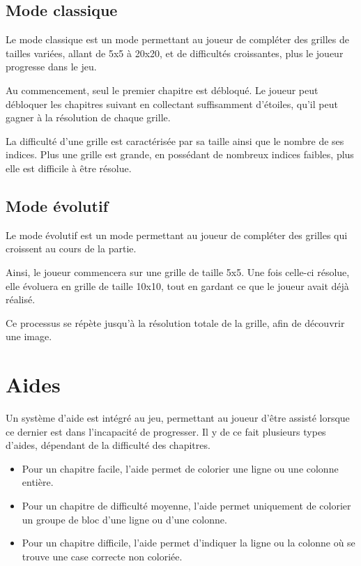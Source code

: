 \documentclass[a4paper, 12pt]{report}
\begin{document}
		\subsection{Mode classique}
		
		    Le mode classique est un mode permettant au joueur de compléter des grilles de tailles variées, allant de 5x5 à 20x20, et de difficultés croissantes, plus le joueur progresse dans le jeu.
		    
		    Au commencement, seul le premier chapitre est débloqué. Le joueur peut débloquer les chapitres suivant en collectant suffisamment d'étoiles, qu'il peut gagner à la résolution de chaque grille.
		    
		    La difficulté d'une grille est caractérisée par sa taille ainsi que le nombre de ses indices. Plus une grille est grande, en possédant de nombreux indices faibles, plus elle est difficile à être résolue.
		    
		\subsection{Mode évolutif}
		
		    Le mode évolutif est un mode permettant au joueur de compléter des grilles qui croissent au cours de la partie.
		    
		    Ainsi, le joueur commencera sur une grille de taille 5x5. Une fois celle-ci résolue, elle évoluera en grille de taille 10x10, tout en gardant ce que le joueur avait déjà réalisé. 
		    
		    Ce processus se répète jusqu'à la résolution totale de la grille, afin de découvrir une image.
			

		\section{Aides}
		\vspace*{0.2cm}
		
			Un système d'aide est intégré au jeu, permettant au joueur d'être assisté lorsque ce dernier est dans l'incapacité de progresser. Il y de ce fait plusieurs types d'aides, dépendant de la difficulté des chapitres.
			\begin{itemize}
			\item Pour un chapitre facile, l'aide permet de colorier une ligne ou une colonne entière. 
			
			\item Pour un chapitre de difficulté moyenne, l'aide permet uniquement de colorier un groupe de bloc d'une ligne ou d'une colonne. 
			
			\item Pour un chapitre difficile, l'aide permet d'indiquer la ligne ou la colonne où se trouve une case correcte non coloriée. 
			\end{itemize}
\end{document}
